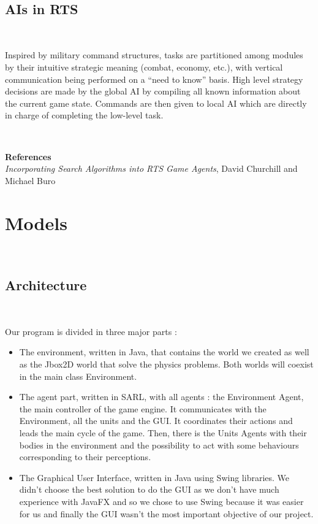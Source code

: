 \documentclass[a4paper,10pt]{book}
\begin{document}
~

\subsection{AIs in RTS}

~

Inspired by  military command structures,  tasks are partitioned among modules
by their intuitive strategic meaning (combat, economy, etc.),
with vertical communication being performed on a “need to
know” basis.  High level strategy decisions are made by the
global AI by compiling all known information about
the current game state.  Commands are then given to local AI
which are directly in charge of completing the low-level task.

~

\textbf{References} 
\textit{\\Incorporating Search Algorithms into RTS Game Agents},
David Churchill and Michael Buro
\newpage
\section {Models}

~

\subsection{Architecture}

~

Our program is divided in three major parts :
\begin{itemize}
 \item The environment, written in Java, that contains the world we created as well as the Jbox2D world that solve the physics
 problems. Both worlds will coexist in the main class Environment.
 \item The agent part, written in SARL, with all agents : the Environment Agent, the main controller of the game engine. It
 communicates with the Environment, all the units and the GUI. It coordinates their actions and leads the main cycle of the game.
 Then, there is the Units Agents with their bodies in the environment and the possibility to act with some behaviours corresponding to
 their perceptions.
 \item The Graphical User Interface, written in Java using Swing libraries. We didn't choose the best solution to do the GUI as
 we don't have much experience with JavaFX and so we chose to use Swing because it was easier for us and finally the GUI wasn't the most
 important objective of our project.
\end{itemize}
\end{document}
